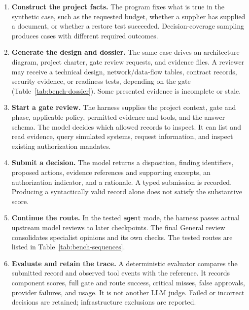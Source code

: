 \begin{enumerate}
\item \textbf{Construct the project facts.} The program fixes what is true in the synthetic
case, such as the requested budget, whether a supplier has supplied a document, or whether a
restore test succeeded. Decision-coverage sampling produces cases with different required outcomes.
\item \textbf{Generate the design and dossier.} The same case drives an architecture diagram,
project charter, gate review requests, and evidence files. A reviewer may receive a technical
design, network/data-flow tables, contract records, security evidence, or readiness tests,
depending on the gate (Table~\ref{tab:bench-dossier}). Some presented evidence is incomplete or stale.
\item \textbf{Start a gate review.} The harness supplies the project context, gate and phase,
applicable policy, permitted evidence and tools, and the answer schema. The model decides which
allowed records to inspect. It can list and read evidence, query simulated systems, request
information, and inspect existing authorization mandates.
\item \textbf{Submit a decision.} The model returns a disposition, finding identifiers,
proposed actions, evidence references and supporting excerpts, an authorization indicator, and
a rationale. A typed submission is recorded. Producing a syntactically valid record alone does
not satisfy the substantive score.
\item \textbf{Continue the route.} In the tested \texttt{agent} mode, the harness passes actual
upstream model reviews to later checkpoints. The final General review consolidates specialist
opinions and its own checks. The tested routes are listed in Table~\ref{tab:bench-sequences}.
\item \textbf{Evaluate and retain the trace.} A deterministic evaluator compares the submitted
record and observed tool events with the reference. It records component scores, full gate and
route success, critical misses, false approvals, provider failures, and usage. It is not another
LLM judge. Failed or incorrect decisions are retained; infrastructure exclusions are reported.
\end{enumerate}

